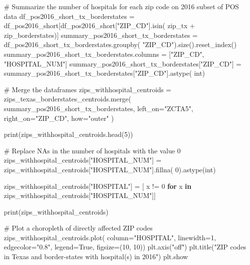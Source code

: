\documentclass[
  letterpaper,
  DIV=11,
  numbers=noendperiod]{scrartcl}
\newenvironment{Shaded}{\begin{snugshade}}{\end{snugshade}}
\newcommand{\BuiltInTok}[1]{\textcolor[rgb]{0.00,0.23,0.31}{#1}}
\newcommand{\CommentTok}[1]{\textcolor[rgb]{0.37,0.37,0.37}{#1}}
\newcommand{\ControlFlowTok}[1]{\textcolor[rgb]{0.00,0.23,0.31}{\textbf{#1}}}
\newcommand{\DecValTok}[1]{\textcolor[rgb]{0.68,0.00,0.00}{#1}}
\newcommand{\KeywordTok}[1]{\textcolor[rgb]{0.00,0.23,0.31}{\textbf{#1}}}
\newcommand{\NormalTok}[1]{\textcolor[rgb]{0.00,0.23,0.31}{#1}}
\newcommand{\OperatorTok}[1]{\textcolor[rgb]{0.37,0.37,0.37}{#1}}
\newcommand{\StringTok}[1]{\textcolor[rgb]{0.13,0.47,0.30}{#1}}
\newcommand{\VariableTok}[1]{\textcolor[rgb]{0.07,0.07,0.07}{#1}}
\begin{document}
\begin{Shaded}
\begin{Highlighting}[]
\CommentTok{\# Summarize the number of hospitals for each zip code on 2016 subset of POS data}
\NormalTok{df\_pos2016\_short\_tx\_borderstates }\OperatorTok{=}\NormalTok{ df\_pos2016\_short[df\_pos2016\_short[}\StringTok{"ZIP\_CD"}\NormalTok{].isin(}
\NormalTok{    zip\_tx }\OperatorTok{+}\NormalTok{ zip\_borderstates)]}
\NormalTok{summary\_pos2016\_short\_tx\_borderstates }\OperatorTok{=}\NormalTok{ df\_pos2016\_short\_tx\_borderstates.groupby(}
    \StringTok{"ZIP\_CD"}\NormalTok{).size().reset\_index()}
\NormalTok{summary\_pos2016\_short\_tx\_borderstates.columns }\OperatorTok{=}\NormalTok{ [}\StringTok{"ZIP\_CD"}\NormalTok{, }\StringTok{"HOSPITAL\_NUM"}\NormalTok{]}
\NormalTok{summary\_pos2016\_short\_tx\_borderstates[}\StringTok{"ZIP\_CD"}\NormalTok{] }\OperatorTok{=}\NormalTok{ summary\_pos2016\_short\_tx\_borderstates[}\StringTok{"ZIP\_CD"}\NormalTok{].astype(}
    \BuiltInTok{int}\NormalTok{)}

\CommentTok{\# Merge the dataframes}
\NormalTok{zips\_withhospital\_centroids }\OperatorTok{=}\NormalTok{ zips\_texas\_borderstates\_centroids.merge(}
\NormalTok{    summary\_pos2016\_short\_tx\_borderstates,}
\NormalTok{    left\_on}\OperatorTok{=}\StringTok{"ZCTA5"}\NormalTok{,}
\NormalTok{    right\_on}\OperatorTok{=}\StringTok{"ZIP\_CD"}\NormalTok{,}
\NormalTok{    how}\OperatorTok{=}\StringTok{"outer"}
\NormalTok{)}

\BuiltInTok{print}\NormalTok{(zips\_withhospital\_centroids.head(}\DecValTok{5}\NormalTok{))}

\CommentTok{\# Replace NAs in the number of hospitals with the value 0}
\NormalTok{zips\_withhospital\_centroids[}\StringTok{"HOSPITAL\_NUM"}\NormalTok{] }\OperatorTok{=}\NormalTok{ zips\_withhospital\_centroids[}\StringTok{"HOSPITAL\_NUM"}\NormalTok{].fillna(}
    \DecValTok{0}\NormalTok{).astype(}\BuiltInTok{int}\NormalTok{)}

\NormalTok{zips\_withhospital\_centroids[}\StringTok{"HOSPITAL"}\NormalTok{] }\OperatorTok{=}\NormalTok{ [}
\NormalTok{    x }\OperatorTok{!=} \DecValTok{0} \ControlFlowTok{for}\NormalTok{ x }\KeywordTok{in}\NormalTok{ zips\_withhospital\_centroids[}\StringTok{"HOSPITAL\_NUM"}\NormalTok{]]}

\BuiltInTok{print}\NormalTok{(zips\_withhospital\_centroids)}

\CommentTok{\# Plot a choropleth of directly affected ZIP codes}
\NormalTok{zips\_withhospital\_centroids.plot(}
\NormalTok{    column}\OperatorTok{=}\StringTok{"HOSPITAL"}\NormalTok{, linewidth}\OperatorTok{=}\DecValTok{1}\NormalTok{, edgecolor}\OperatorTok{=}\StringTok{"0.8"}\NormalTok{, legend}\OperatorTok{=}\VariableTok{True}\NormalTok{, figsize}\OperatorTok{=}\NormalTok{(}\DecValTok{10}\NormalTok{, }\DecValTok{10}\NormalTok{))}
\NormalTok{plt.axis(}\StringTok{"off"}\NormalTok{)}
\NormalTok{plt.title(}\StringTok{"ZIP codes in Texas and border{-}states with hospital(s) in 2016"}\NormalTok{)}
\NormalTok{plt.show}
\end{Highlighting}
\end{Shaded}
\end{document}
